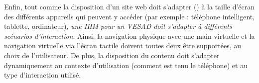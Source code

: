 
Enfin, tout comme la disposition d'un site web doit s'adapter () à la taille d'écran des différents appareils qui peuvent y accéder (par exemple : téléphone intelligent, tablette, ordinateur), \emph{une IHM pour un VESAD doit s'adapter à différents scénarios d'interaction}. Ainsi, la navigation physique avec une main virtuelle et la navigation virtuelle via l'écran tactile doivent toutes deux être supportées, au choix de l'utilisateur. De plus, la disposition du contenu doit s'adapter dynamiquement au contexte d'utilisation (comment est tenu le téléphone) et au type d'interaction utilisé.




